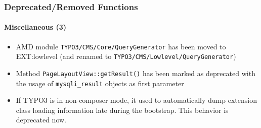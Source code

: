 \begin{frame}[fragile]
	\frametitle{Deprecated/Removed Functions}
	\framesubtitle{Miscellaneous (3)}

	\begin{itemize}

		\item AMD module \texttt{TYPO3/CMS/Core/QueryGenerator} has been moved to EXT:lowlevel\newline
			\small
				(and renamed to \texttt{TYPO3/CMS/Lowlevel/QueryGenerator})
			\normalsize

		\item Method \texttt{PageLayoutView::getResult()} has been marked as deprecated with
			the usage of \texttt{mysqli\_result} objects as first parameter

		\item If TYPO3 is in non-composer mode, it used to automatically dump extension class
			loading information late during the bootstrap. This behavior is deprecated now.
	\end{itemize}

\end{frame}

